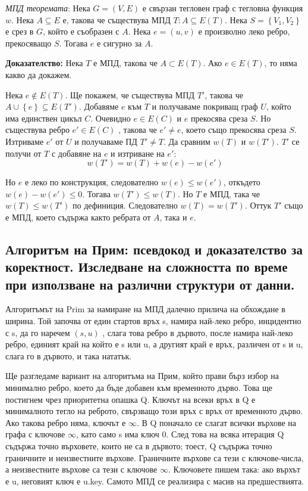 \documentclass{article}
\renewcommand{\\}{\newline}
\newcommand{\doc}{\textbf{Доказателство: }}
\begin{document}
\textit{МПД теоремата}: Нека \(G = (V, E)\) е свързан тегловен граф с тегловна функция \(w\). Нека \(A \subseteq E\) е, такова че съществува МПД \(T: A \subseteq E(T)\). Нека \(S = \left\{V_1, V_2\right\}\) е срез в \(G\), който е съобразен с \(A\). Нека \(e = (u, v)\) е произволно леко ребро, прекосяващо \(S\). Тогава \(e\) е сигурно за \(A\).          

\doc Нека \(T\) е МПД, такова че \(A \subset E(T)\). Ако \(e \in E(T)\), то няма какво да докажем.

Нека \(e\not\in E(T)\). Ще покажем, че съществува МПД \(T'\), такова че \(A \cup \left\{e\right\} \subseteq E(T')\). Добавяме \(e\) към \(T\) и получаваме покриващ граф \(U\), който има единствен цикъл \(C\). Очевидно \(e \in E(C)\) и \(e\) прекосява среза \(S\). Но съществува ребро \(e' \in E(C)\) , такова че \(e' \not=e\), което също прекосява среза \(S\). Изтриваме \(e'\) от \(U\) и получаваме ПД \(T' \not= T\). Да сравним \(w(T)\) и \(w(T')\). \(T'\) се получи от \(T\) с добавяне на \(e\) и изтриване на \(e'\): \[
  w(T') = w(T) + w(e) - w(e')
\]                     

Но \(e\) е леко по конструкция, следователно \(w(e) \leq w(e')\), откъдето \(w(e) - w(e') \leq 0\). Тогава \(w(T') \leq w(T)\). Но \(T\) е МПД, така че \(w(T) \leq w(T')\) по дефиниция. Следователно \(w(T) = w(T')\). Оттук \(T'\) също е МПД, което съдържа както ребрата от \(A\), така и \(e\).          

\subsection{Алгоритъм на Прим: псевдокод и доказателство за коректност. Изследване на сложността по време при използване на различни структури от данни.}

Алгоритъмът на Prim за намиране на МПД далечно прилича на обхождане в ширина. Той започва от един стартов връх s, намира най-леко ребро, инцидентно с s, да го наречем \((s, u)\)  , слага това ребро в дървото, после намира най-леко ребро, единият край на който е s или u, а другият край е връх, различен от s и u, слага го в дървото, и така нататък.

Ще разгледаме вариант на алгоритъма на Прим, който прави бърз избор на минимално ребро, което да бъде добавен към временното дърво. Това ще постигнем чрез приоритетна опашка Q. Ключът на всеки връх в Q е минималното тегло на реброто, свързващо този връх с връх от временното дърво. Ако такова ребро няма, ключът е \(\infty\). В Q поначало се слагат всички върхове на графа с ключове \(\infty\), като само s има ключ 0. След това на всяка итерация Q съдържа точно върховете, които не са в дървото; тоест, Q съдържа точно граничните и неизвестните върхове. Граничните върхове са тези с ключове-числа, а неизвестните върхове са тези с ключове \(\infty\). Ключовете пишем така: ако върхът е u, неговият ключ е u.key. Самото МПД се реализира с масив на предшествията.
\end{document}
